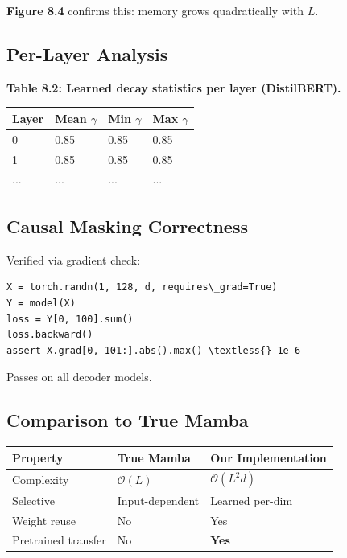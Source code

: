 \textbf{Figure 8.4} confirms this: memory grows quadratically with $L$.

\subsection{Per-Layer Analysis}

\textbf{Table 8.2: Learned decay statistics per layer (DistilBERT).}

\begin{table}[H]
\centering
\small
\begin{tabular}{llll}
\toprule
\textbf{Layer} & \textbf{Mean $\gamma$} & \textbf{Min $\gamma$} & \textbf{Max $\gamma$} \\
\midrule
0 & 0.85 & 0.85 & 0.85 \\
1 & 0.85 & 0.85 & 0.85 \\
... & ... & ... & ... \\
\bottomrule
\end{tabular}
\end{table}

\subsection{Causal Masking Correctness}

Verified via gradient check:

\begin{lstlisting}
X = torch.randn(1, 128, d, requires\_grad=True)
Y = model(X)
loss = Y[0, 100].sum()
loss.backward()
assert X.grad[0, 101:].abs().max() \textless{} 1e-6
\end{lstlisting}

Passes on all decoder models.

\subsection{Comparison to True Mamba}

\begin{table}[H]
\centering
\small
\begin{tabular}{lll}
\toprule
\textbf{Property} & \textbf{True Mamba} & \textbf{Our Implementation} \\
\midrule
Complexity & $\mathcal{O}(L)$ & $\mathcal{O}(L^2 d)$ \\
Selective & Input-dependent & Learned per-dim \\
Weight reuse & No & Yes \\
Pretrained transfer & No & \textbf{Yes} \\
\bottomrule
\end{tabular}
\end{table}

